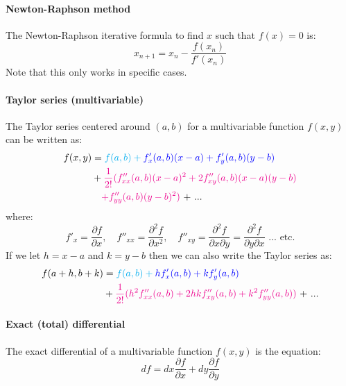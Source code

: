 \documentclass{scrartcl}
\begin{document}
\paragraph{Newton-Raphson method}
The Newton-Raphson iterative formula to find $ x $ such that $ f(x) = 0 $ is:
\begin{equation}
x_{n+1} = x_{n} - \frac{f(x_{n})}{f'(x_{n})}
\end{equation}
Note that this only works in specific cases.

\paragraph{Taylor series (multivariable)}
The Taylor series centered around $ (a, b) $ for a multivariable function $ f(x, y) $ can be written as:
\begin{align}
f(x, y) & = \color{cyan}{f(a, b)} + \color{blue}{f'_{x}(a, b)(x-a) + f'_{y}(a, b)(y-b)} \\
& + \color{magenta}{\frac{1}{2!}(f''_{xx}(a, b)(x-a)^{2} + 2f''_{xy}(a, b)(x-a)(y-b)} \\
& \ \ \ \color{magenta}{ + f''_{yy}(a, b)(y-b)^{2})} \color{black}{\textrm{ + ...}}
\end{align}
where:
\begin{equation}
f'_{x} = \frac{\partial f}{\partial x}, \quad f''_{xx} = \frac{\partial^{2} f}{\partial x^{2}}, \quad f''_{xy} = \frac{\partial^{2} f}{\partial x \partial y} = \frac{\partial^{2} f}{\partial y \partial x}\textrm{ ... etc.}
\end{equation}
If we let $ h = x - a $ and $ k = y - b $ then we can also write the Taylor series as:
\begin{align}
f(a+h, b+k) & = \color{cyan}{f(a, b)} + \color{blue}{hf'_{x}(a, b) + kf'_{y}(a, b)} \\
& + \color{magenta}{\frac{1}{2!}(h^{2}f''_{xx}(a, b) + 2hkf''_{xy}(a, b) + k^{2}f''_{yy}(a, b))} \color{black}{\textrm{ + ...}}
\end{align}

\paragraph{Exact (total) differential}
The exact differential of a multivariable function $ f(x, y) $ is the equation:
\begin{equation}
df = dx \frac{\partial f}{\partial  x} + dy \frac{\partial f}{\partial  y}
\end{equation}
\end{document}
